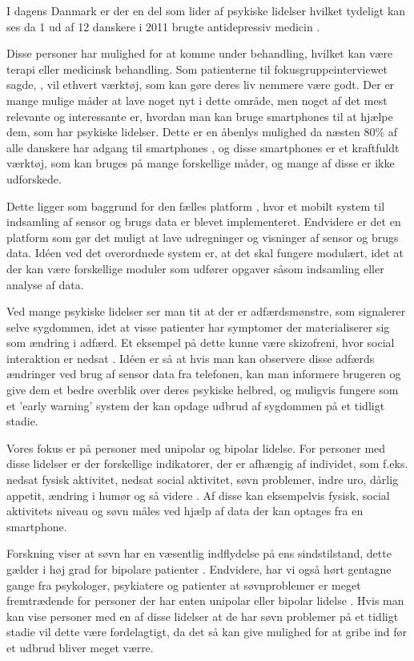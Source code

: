 I dagens Danmark er der en del som lider af psykiske lidelser hvilket tydeligt kan ses da 1 ud af 12 danskere i 2011 brugte antidepressiv medicin \citep{misc:forbrugAntidepressiva}. 

Disse personer har mulighed for at komme under behandling, hvilket kan være terapi eller medicinsk behandling.
Som patienterne til fokusgruppeinterviewet sagde, \citep[Kapitel 1, Sektion 5]{misc:faellesrapp}, vil ethvert værktøj, som kan gøre deres liv nemmere være godt.
Der er mange mulige måder at lave noget nyt i dette område, men noget af det mest relevante og interessante er, hvordan man kan bruge smartphones til at hjælpe dem, som har psykiske lidelser.
Dette er en åbenlys mulighed da næsten 80\% af alle danskere har adgang til smartphones \citep{misc:dstElektronik}, og disse smartphones er et kraftfuldt værktøj, som kan bruges på mange forskellige måder, og mange af disse er ikke udforskede.

Dette ligger som baggrund for den fælles platform \citep{misc:faellesrapp}, hvor et mobilt system til indsamling af sensor og brugs data er blevet implementeret. 
Endvidere er det en platform som gør det muligt at lave udregninger og visninger af sensor og brugs data.
Idéen ved det overordnede system er, at det skal fungere modulært, idet at der kan være forskellige moduler som udfører opgaver såsom indsamling eller analyse af data.

Ved mange psykiske lidelser ser man tit at der er adfærdsmønstre, som signalerer selve sygdommen, idet at visse patienter har symptomer der materialiserer sig som ændring i adfærd.
Et eksempel på dette kunne være skizofreni, hvor social interaktion er nedsat \citep{misc:negativeSymptomsSchizo}.
Idéen er så at hvis man kan observere disse adfærds ændringer ved brug af sensor data fra telefonen, kan man informere brugeren og give dem et bedre overblik over deres psykiske helbred, og muligvis fungere som et 'early warning' system der kan opdage udbrud af sygdommen på et tidligt stadie.

Vores fokus er på personer med unipolar og bipolar lidelse. 
For personer med disse lidelser er der forskellige indikatorer, der er afhængig af individet, som f.eks. nedsat fysisk aktivitet, nedsat social aktivitet, søvn problemer, indre uro, dårlig appetit, ændring i humør og så videre \citep{misc:faellesrapp}.
Af disse kan eksempelvis fysisk, social aktivitets niveau og søvn måles ved hjælp af data der kan optages fra en smartphone.

Forskning viser at søvn har en væsentlig indflydelse på ens sindstilstand, dette gælder i høj grad for bipolare patienter \citep{CPSP:CPSP1164}.
Endvidere, har vi også hørt gentagne gange fra psykologer, psykiatere og patienter at søvnproblemer er meget fremtrædende for personer der har enten unipolar eller bipolar lidelse \citep[Kapitel 2, Sektion 3,4,5]{misc:faellesrapp}.
Hvis man kan vise personer med en af disse lidelser at de har søvn problemer på et tidligt stadie vil dette være fordelagtigt, da det så kan give mulighed for at gribe ind før et udbrud bliver meget værre.

